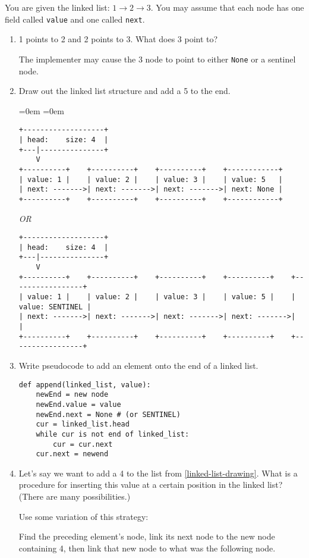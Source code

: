 %
%


You are given the linked list: $1 \rightarrow 2 \rightarrow 3$.  You may assume that each node has one field called \texttt{value} and one called \texttt{next}.
        \begin{enumerate}
            \item 1 points to 2 and 2 points to 3. What does 3 point to? \\
                \begin{answer}
				The implementer may cause the 3 node to point to either \texttt{None} or a sentinel node.
				\end{answer}
            \item \label{linked-list-drawing} Draw out the linked list structure and add a 5 to the end.
				\begin{answer}
				\leftmargin=0em
				\itemindent=0em
				{ \small
				\begin{verbatim}
+-------------------+
| head:    size: 4  |
+---|---------------+
    V
+----------+    +----------+    +----------+    +------------+
| value: 1 |    | value: 2 |    | value: 3 |    | value: 5   |
| next: ------->| next: ------->| next: ------->| next: None |
+----------+    +----------+    +----------+    +------------+
				\end{verbatim}
				\textit{OR}
				\begin{verbatim}
+-------------------+
| head:    size: 4  |
+---|---------------+
    V
+----------+    +----------+    +----------+    +----------+    +-----------------+
| value: 1 |    | value: 2 |    | value: 3 |    | value: 5 |    | value: SENTINEL |
| next: ------->| next: ------->| next: ------->| next: ------->|                 |
+----------+    +----------+    +----------+    +----------+    +-----------------+
				\end{verbatim} }
				\end{answer}
            \item Write pseudocode to add an element onto the end of a linked list.
				\begin{answer}
				\begin{lstlisting}[numbers=none]
def append(linked_list, value):
	newEnd = new node
	newEnd.value = value
	newEnd.next = None # (or SENTINEL)
	cur = linked_list.head
	while cur is not end of linked_list:
		cur = cur.next
	cur.next = newend
				\end{lstlisting}
				\end{answer}
				\vspace{1in}
            \item Let's say we want to add a 4 to the list from \ref{linked-list-drawing}.
				What is a procedure for inserting this value at a certain position in the linked list?
				(There are many possibilities.) \\
                \begin{answer}
				Use some variation of this strategy:

				Find the preceding element's node, link its next node to the new node containing 4,
				then link that new node to what was the following node.
				\end{answer}
				\vspace{.25in}
        \end{enumerate}